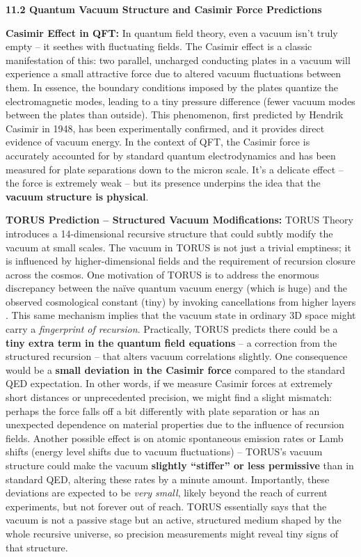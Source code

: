 \textbf{11.2 Quantum Vacuum Structure and Casimir Force Predictions}

\textbf{Casimir Effect in QFT:} In quantum field theory, even a vacuum
isn't truly empty -- it seethes with fluctuating fields. The Casimir
effect is a classic manifestation of this: two parallel, uncharged
conducting plates in a vacuum will experience a small attractive force
due to altered vacuum fluctuations between them​. In essence, the
boundary conditions imposed by the plates quantize the electromagnetic
modes, leading to a tiny pressure difference (fewer vacuum modes between
the plates than outside)​. This phenomenon, first predicted by Hendrik
Casimir in 1948, has been experimentally confirmed, and it provides
direct evidence of vacuum energy. In the context of QFT, the Casimir
force is accurately accounted for by standard quantum electrodynamics
and has been measured for plate separations down to the micron scale.
It's a delicate effect -- the force is extremely weak -- but its
presence underpins the idea that the \textbf{vacuum structure is
physical}.

\textbf{TORUS Prediction -- Structured Vacuum Modifications:} TORUS
Theory introduces a 14-dimensional recursive structure that could subtly
modify the vacuum at small scales. The vacuum in TORUS is not just a
trivial emptiness; it is influenced by higher-dimensional fields and the
requirement of recursion closure across the cosmos. One motivation of
TORUS is to address the enormous discrepancy between the naïve quantum
vacuum energy (which is huge) and the observed cosmological constant
(tiny) by invoking cancellations from higher layers​. This same
mechanism implies that the vacuum state in ordinary 3D space might carry
a \emph{fingerprint of recursion}. Practically, TORUS predicts there
could be a \textbf{tiny extra term in the quantum field equations} -- a
correction from the structured recursion -- that alters vacuum
correlations slightly​. One consequence would be a \textbf{small
deviation in the Casimir force} compared to the standard QED
expectation​. In other words, if we measure Casimir forces at extremely
short distances or unprecedented precision, we might find a slight
mismatch: perhaps the force falls off a bit differently with plate
separation or has an unexpected dependence on material properties due to
the influence of recursion fields. Another possible effect is on atomic
spontaneous emission rates or Lamb shifts (energy level shifts due to
vacuum fluctuations) -- TORUS's vacuum structure could make the vacuum
\textbf{slightly ``stiffer'' or less permissive} than in standard QED,
altering these rates by a minute amount​. Importantly, these deviations
are expected to be \emph{very small}, likely beyond the reach of current
experiments, but not forever out of reach​. TORUS essentially says that
the vacuum is not a passive stage but an active, structured medium
shaped by the whole recursive universe, so precision measurements might
reveal tiny signs of that structure.

